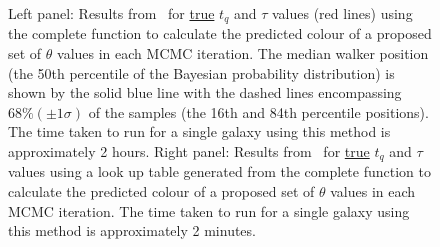 \begin{figure}
\caption[Comparing complete and look-up table versions of \starpy]{Left panel: Results from \starpy ~for \underline{true} $t_q$ and $\tau$ values (red lines) using the complete function to calculate the predicted colour of a proposed set of $\theta$ values in each MCMC iteration. The median walker position (the 50th percentile of the Bayesian probability distribution) is shown by the solid blue line with the dashed lines encompassing $68\% (\pm 1\sigma)$ of the samples (the 16th and 84th percentile positions). The time taken to run for a single galaxy using this method is approximately 2 hours. Right panel: Results from \starpy ~for \underline{true} $t_q$ and $\tau$ values using a look up table generated from the complete function to calculate the predicted colour of a proposed set of $\theta$ values in each MCMC iteration. The time taken to run for a single galaxy using this method is approximately 2 minutes.}
\label{lookup}
\end{figure}

